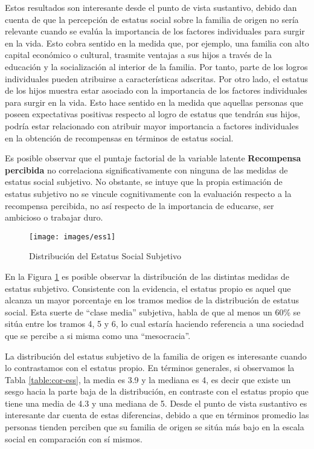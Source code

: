 \documentclass[12pt]{article}
\begin{document}
\renewcommand{\arraystretch}{0.65}


Estos resultados son interesante desde el punto de vista sustantivo, debido dan cuenta de que la percepción de estatus social sobre la familia de origen no sería relevante cuando se evalúa la importancia de los factores individuales para surgir en la vida. Esto cobra sentido en la medida que, por ejemplo, una familia con alto capital económico o cultural, trasmite ventajas a sus hijos a través de la educación y la socialización al interior de la familia. Por tanto, parte de los logros individuales pueden atribuirse a características adscritas. Por otro lado, el estatus de los hijos muestra estar asociado con la importancia de los factores individuales para surgir en la vida. Esto hace sentido en la medida que aquellas personas que poseen expectativas positivas respecto al logro de estatus que tendrán sus hijos, podría estar relacionado con  atribuir mayor importancia a factores individuales en la obtención de recompensas en términos de estatus social.   
 	
Es posible observar que el puntaje factorial de la variable latente \textbf{Recompensa percibida} no correlaciona significativamente con ninguna de las medidas de estatus social subjetivo. No obstante, se intuye que la propia estimación de estatus subjetivo no se vincule cognitivamente con la evaluación respecto a la recompensa percibida, no así respecto de la importancia de educarse, ser ambicioso o trabajar duro. 

\begin{figure}[!h]
	\centering
	\texttt{[image: images/ess1]}
	\caption[Figura 2: Distribución del Estatus Social Subjetivo]{Distribución del Estatus Social Subjetivo}
	\label{fig:ess1}
\end{figure}

En la Figura \ref{fig:ess1} es posible observar la distribución de las distintas medidas de estatus subjetivo. Consistente con la evidencia, el estatus propio es aquel que alcanza un mayor porcentaje en los tramos medios de la distribución de estatus social. Esta suerte de ``clase media'' subjetiva, habla de que al menos un 60\% se sitúa entre los tramos 4, 5 y 6, lo cual estaría haciendo referencia a una sociedad que se percibe a si misma como una ``mesocracia''.

La distribución del estatus subjetivo de la familia de origen es interesante cuando lo contrastamos con el estatus propio. En términos generales, si observamos la Tabla \ref{table:cor-ess}, la media es 3.9 y la mediana es 4, es decir que existe un sesgo hacia la parte baja de la distribución, en contraste con el estatus propio que tiene una media de 4.3 y una mediana de 5. Desde el punto de vista sustantivo es interesante dar cuenta de estas diferencias, debido a que en términos promedio las personas tienden perciben que su familia de origen se sitúa más bajo en la escala social en comparación con sí mismos.
\end{document}
